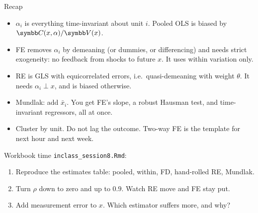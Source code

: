 \documentclass[aspectratio=169,11pt]{beamer}
\begin{document}
\begin{frame}{Recap}
\begin{itemize}
	\item $\alpha_i$ is everything time-invariant about unit $i$. Pooled OLS is biased by
	$\Cov(x, \alpha)/\Var(x)$.
	\medskip
	\item FE removes $\alpha_i$ by demeaning (or dummies, or differencing) and needs \alert{strict
	exogeneity}: no feedback from shocks to future $x$. It uses within variation only.
	\medskip
	\item RE is GLS with equicorrelated errors, i.e.\ quasi-demeaning with weight $\theta$. It needs
	$\alpha_i \perp x$, and is biased otherwise.
	\medskip
	\item Mundlak: add $\bar x_i$. You get FE's slope, a robust Hausman test, and time-invariant
	regressors, all at once.
	\medskip
	\item Cluster by unit. Do not lag the outcome. Two-way FE is the template for next hour and next week.
\end{itemize}
\end{frame}


\begin{frame}{Workbook time}
\texttt{inclass\_session8.Rmd}:
\begin{enumerate}
	\item Reproduce the estimates table: pooled, within, FD, hand-rolled RE, Mundlak.
	\item Turn $\rho$ down to zero and up to $0.9$. Watch RE move and FE stay put.
	\item Add measurement error to $x$. Which estimator suffers more, and why?
\end{enumerate}
\end{frame}
\end{document}

